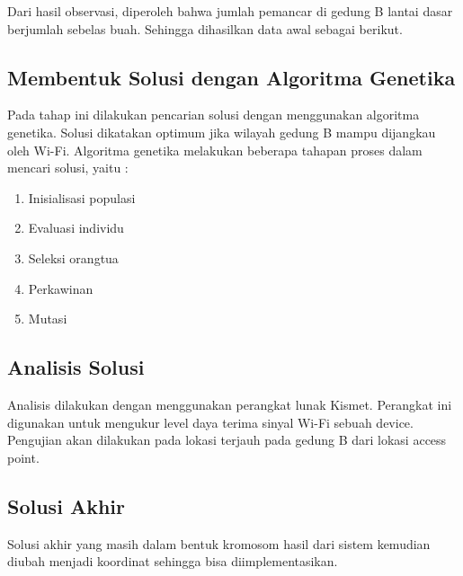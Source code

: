 \documentclass[12pt,a4paper,oneside,titlepage]{report}
\begin{document}
		Dari hasil observasi, diperoleh bahwa jumlah pemancar di gedung B lantai dasar berjumlah sebelas buah. Sehingga dihasilkan data awal sebagai berikut.
		\subsection{Membentuk Solusi dengan Algoritma Genetika}
		Pada tahap ini dilakukan pencarian solusi dengan menggunakan algoritma genetika. Solusi dikatakan optimum jika wilayah  gedung B mampu dijangkau oleh Wi-Fi. Algoritma genetika melakukan beberapa tahapan proses dalam mencari solusi, yaitu :
		\begin{enumerate}
			\item Inisialisasi populasi
			\item Evaluasi individu
			\item Seleksi orangtua
			\item Perkawinan
			\item Mutasi
		\end{enumerate}
		\subsection{Analisis Solusi}
		Analisis dilakukan dengan menggunakan perangkat lunak Kismet. Perangkat ini digunakan untuk mengukur level daya terima sinyal Wi-Fi sebuah device. Pengujian akan dilakukan pada lokasi terjauh pada gedung B dari lokasi access point. 
		
		\subsection{Solusi Akhir}
		Solusi akhir yang masih dalam bentuk kromosom hasil dari sistem kemudian diubah menjadi koordinat sehingga bisa diimplementasikan.
		
		\newpage
		
		\nocite{*}
		
		
\end{document}

